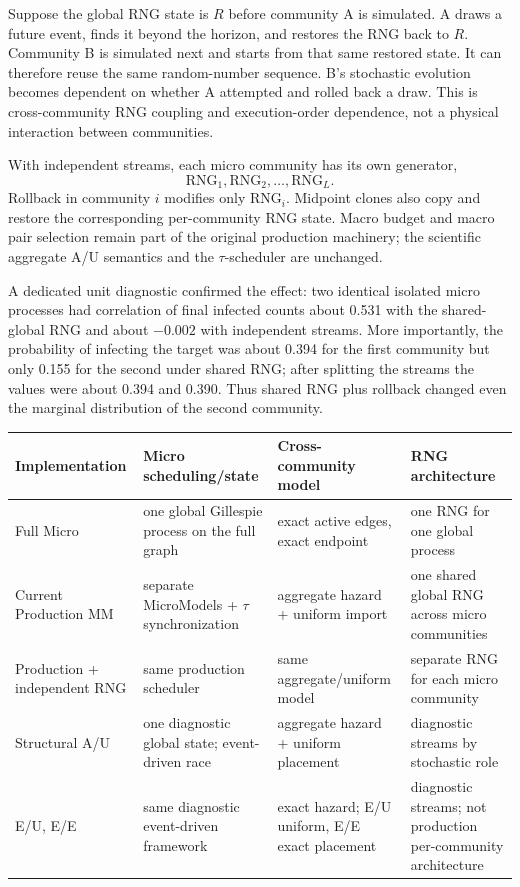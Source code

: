 \documentclass[11pt,a4paper]{article}
\begin{document}
\begin{tcolorbox}[colback=soft,colframe=macro,title=Why this creates artificial dependence]
Suppose the global RNG state is $R$ before community A is simulated. A draws a future event, finds it beyond the horizon, and restores the RNG back to $R$. Community B is simulated next and starts from that same restored state. It can therefore reuse the same random-number sequence. B's stochastic evolution becomes dependent on whether A attempted and rolled back a draw. This is cross-community RNG coupling and execution-order dependence, not a physical interaction between communities.
\end{tcolorbox}

With independent streams, each micro community has its own generator,
\[
\mathrm{RNG}_1,\mathrm{RNG}_2,\ldots,\mathrm{RNG}_L.
\]
Rollback in community $i$ modifies only $\mathrm{RNG}_i$. Midpoint clones also copy and restore the corresponding per-community RNG state. Macro budget and macro pair selection remain part of the original production machinery; the scientific aggregate A/U semantics and the $\tau$-scheduler are unchanged.

A dedicated unit diagnostic confirmed the effect: two identical isolated micro processes had correlation of final infected counts about 0.531 with the shared-global RNG and about $-0.002$ with independent streams. More importantly, the probability of infecting the target was about 0.394 for the first community but only 0.155 for the second under shared RNG; after splitting the streams the values were about 0.394 and 0.390. Thus shared RNG plus rollback changed even the marginal distribution of the second community.

\begin{center}
\small
\begin{tabularx}{\textwidth}{>{\raggedright\arraybackslash}p{31mm} X X X}
\toprule
\textbf{Implementation} & \textbf{Micro scheduling/state} & \textbf{Cross-community model} & \textbf{RNG architecture}\\
\midrule
Full Micro & one global Gillespie process on the full graph & exact active edges, exact endpoint & one RNG for one global process\\
Current Production MM & separate MicroModels + $\tau$ synchronization & aggregate hazard + uniform import & one shared global RNG across micro communities\\
Production + independent RNG & same production scheduler & same aggregate/uniform model & separate RNG for each micro community\\
Structural A/U & one diagnostic global state; event-driven race & aggregate hazard + uniform placement & diagnostic streams by stochastic role\\
E/U, E/E & same diagnostic event-driven framework & exact hazard; E/U uniform, E/E exact placement & diagnostic streams; not production per-community architecture\\
\bottomrule
\end{tabularx}
\end{center}
\end{document}
